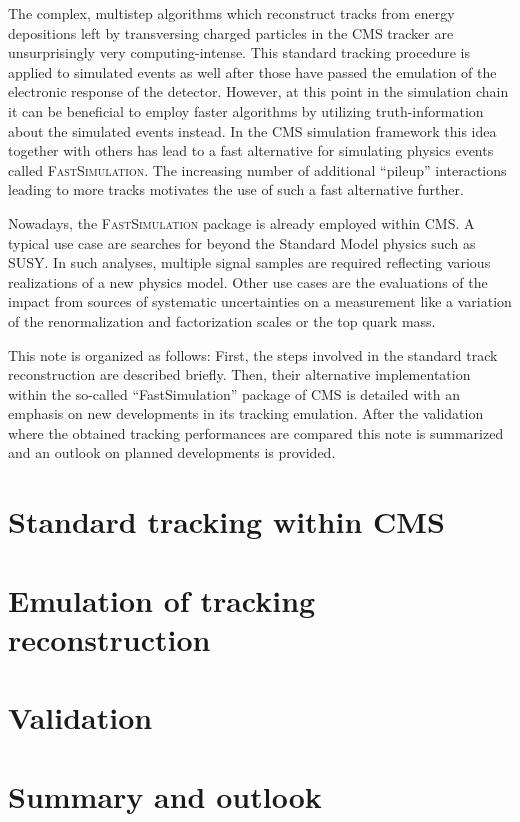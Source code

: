 \documentclass[a4paper]{jpconf}
\begin{document}
The complex, multistep algorithms which reconstruct tracks from energy depositions left by transversing charged particles in the CMS tracker are unsurprisingly very computing-intense. This standard tracking procedure is applied to simulated events as well after those have passed the emulation of the electronic response of the detector. However, at this point in the simulation chain it can be beneficial to employ faster algorithms by utilizing truth-information about the simulated events instead. In the CMS simulation framework this idea together with others has lead to a fast alternative for simulating physics events called \textsc{FastSimulation}. The increasing number of additional ``pileup'' interactions leading to more tracks motivates the use of such a fast alternative further.

Nowadays, the \textsc{FastSimulation} package is already employed  within CMS. A typical use case are searches for beyond the Standard Model physics such as SUSY. In such analyses, multiple signal samples are required reflecting various realizations of a new physics model. Other use cases are the evaluations of the impact from sources of systematic uncertainties on a measurement like a variation of the renormalization and factorization scales or the top quark mass.

This note is organized as follows: First, the steps involved in the standard track reconstruction are described briefly. Then, their alternative implementation within the so-called ``FastSimulation'' package of CMS is detailed with an emphasis on new developments in its tracking emulation. After the validation where the obtained tracking performances are compared this note is summarized and an outlook on planned developments is provided.

\section{Standard tracking within CMS}

\section{Emulation of tracking reconstruction}

\section{Validation}

\section{Summary and outlook}
\end{document}
